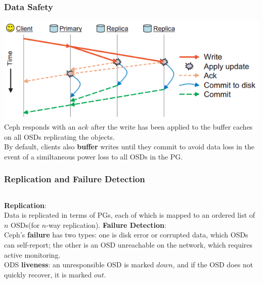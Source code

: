 \documentclass[cjk,slidestop,mathserif]{beamer}
\begin{document}
\begin{CJK}{UTF8}{gkai}
\begin{frame}
 \frametitle{Data Safety}
 \includegraphics[width=\textwidth]{p4.png} \\
 Ceph responds with an $ack$ after the write has been applied to the buffer caches on all OSDs replicating the objects.\\
 \vspace{4pt}
 By default, clients also \textbf{buffer} writes until they commit to avoid data loss in the event of a similtaneous power loss to all OSDs	in the PG.
\end{frame}

\begin{frame}
 \frametitle{Replication and Failure Detection}
 \vspace{6pt}
 \begin{columns}[c]
    \textbf{Replication}: \\
    Data is replicated in terms of PGs, each of which is mapped to an ordered list of $n$ OSDs(for $n$-way replication).
    \textbf{Failure Detection}: \\
    Ceph's \textbf{failure} has two types: one is disk error or corrupted data, which OSDs can self-report; 
    the other is an OSD unreachable on the network, which requires active monitoring. \\
    \vspace{4pt}
    ODS \textbf{liveness}: an unresponsible OSD is marked $down$, and if the OSD does not quickly recover, it is marked $out$.
 \end{columns}
\end{frame}


\end{CJK}
\end{document}
